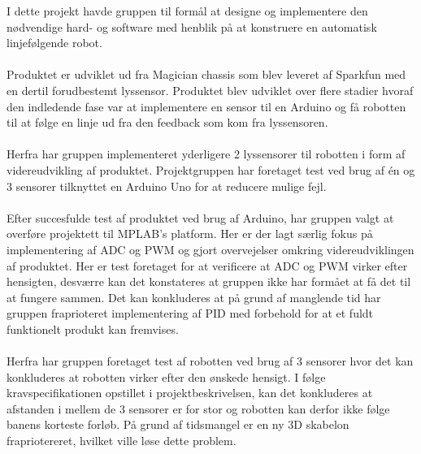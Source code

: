 I dette projekt havde gruppen til formål at designe og implementere den nødvendige hard- og software med henblik på at konstruere en automatisk linjefølgende robot.
\\
\\
Produktet er udviklet ud fra Magician chassis som blev leveret af Sparkfun med en dertil forudbestemt lyssensor. Produktet blev udviklet over flere stadier hvoraf den indledende fase var at implementere en sensor til en Arduino og få robotten til at følge en linje ud fra den feedback som kom fra lyssensoren. 
\\
\\
Herfra har gruppen implementeret yderligere 2 lyssensorer til robotten i form af videreudvikling af produktet. Projektgruppen har foretaget test ved brug af én og 3 sensorer tilknyttet en Arduino Uno for at reducere mulige fejl. 
\\
\\
Efter succesfulde test af produktet ved brug af Arduino, har gruppen valgt at overføre projektett til MPLAB's platform. Her er der lagt særlig fokus på implementering af ADC og PWM og gjort overvejelser omkring videreudviklingen af produktet. Her er test foretaget for at verificere at ADC og PWM virker efter hensigten, desværre kan det konstateres at gruppen ikke har formået at få det til at fungere sammen. Det kan konkluderes at på grund af manglende tid har gruppen fraprioteret implementering af PID med forbehold for at et fuldt funktionelt produkt kan fremvises. 
\\
\\
Herfra har gruppen foretaget test af robotten ved brug af 3 sensorer hvor det kan konkluderes at robotten virker efter den ønskede hensigt. I følge kravspecifikationen opstillet i projektbeskrivelsen, kan det konkluderes at afstanden i mellem de 3 sensorer er for stor og robotten kan derfor ikke følge banens korteste forløb. På grund af tidsmangel er en ny 3D skabelon frapriotereret, hvilket ville løse dette problem.    

